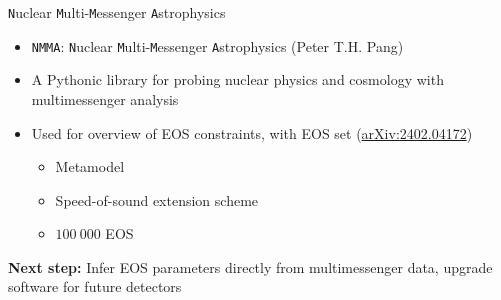 \documentclass[usenames,dvipsnames,t]{beamer}
\begin{document}
\begin{frame}{\texttt{N}uclear \texttt{M}ulti-\texttt{M}essenger \texttt{A}strophysics}

  \def\x{7mm}
  \def\y{3mm}
  
  \begin{itemize}
    \item \texttt{NMMA}: \texttt{N}uclear \texttt{M}ulti-\texttt{M}essenger \texttt{A}strophysics (Peter T.H. Pang) 
    
    \vspace{\x}

    \item A Pythonic library for probing nuclear physics and cosmology with multimessenger analysis
    
    \pause
    \vspace{\x}

    \item Used for overview of EOS constraints, with  EOS set (\href{https://arxiv.org/abs/2402.04172}{arXiv:2402.04172})
    \begin{itemize}
      \item Metamodel
      \item Speed-of-sound extension scheme
      \item $100 \ 000$ EOS
    \end{itemize}
  \end{itemize}

  \vspace{\y}
  \pause

  \begin{tcolorbox}[colback=blue!10, boxrule=0pt]
    \textbf{Next step:} Infer EOS parameters directly from multimessenger data, upgrade software for future detectors
  \end{tcolorbox}
  
  \end{frame}


\end{document}
